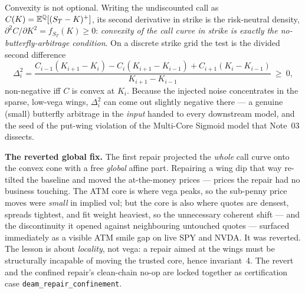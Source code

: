 \documentclass[11pt]{article}
\begin{document}
Convexity is not optional. Writing the undiscounted call as
$C(K)=\mathbb{E}^{\mathbb{Q}}[(S_T-K)^+]$, its second derivative in strike is the risk-neutral
density, $\partial^2C/\partial K^2=f_{S_T}(K)\ge0$: \emph{convexity of the call
curve in strike is exactly the no-butterfly-arbitrage condition}. On a discrete
strike grid the test is the divided second difference
\begin{equation}
\Delta^2_i=\frac{C_{i-1}(K_{i+1}-K_i)-C_i(K_{i+1}-K_{i-1})+C_{i+1}(K_i-K_{i-1})}
{K_{i+1}-K_{i-1}}\ \ge\ 0,
\label{eq:bfly_strike}
\end{equation}
non-negative iff $C$ is convex at $K_i$. Because the injected noise concentrates
in the sparse, low-vega wings, $\Delta^2_i$ can come out slightly negative there
--- a genuine (small) butterfly arbitrage in the \emph{input} handed to every
downstream model, and the seed of the put-wing violation of the Multi-Core
Sigmoid model that Note~03 dissects.

\begin{caution}
\textbf{The reverted global fix.} The first repair projected the \emph{whole}
call curve onto the convex cone with a free \emph{global} affine part. Repairing
a wing dip that way re-tilted the baseline and moved the at-the-money prices ---
prices the repair had no business touching. The ATM core is where vega peaks, so
the sub-penny price moves were \emph{small} in implied vol; but the core is also
where quotes are densest, spreads tightest, and fit weight heaviest, so the
unnecessary coherent shift --- and the discontinuity it opened against
neighbouring untouched quotes --- surfaced immediately as a visible ATM smile
gap on live SPY and NVDA. It was reverted. The lesson is about \emph{locality},
not vega: a repair aimed at the wings must be structurally incapable of moving
the trusted core, hence invariant~4. The revert and the confined repair's
clean-chain no-op are locked together as certification case
\texttt{deam\_repair\_confinement}.
\end{caution}
\end{document}
